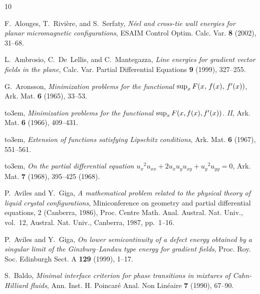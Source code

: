 \documentclass[a4paper]{article}
\theoremstyle{definition}
\theoremstyle{remark}
\begin{document}
\def\cprime{$'$}
\providecommand{\bysame}{\leavevmode\hbox to3em{\hrulefill}\thinspace}
\providecommand{\MR}{\relax\ifhmode\unskip\space\fi MR }
\providecommand{\MRhref}[2]{%
  \href{http://www.ams.org/mathscinet-getitem?mr=#1}{#2}
}
\providecommand{\href}[2]{#2}
\begin{thebibliography}{10}

F.~Alouges, T.~Rivi{\`e}re, and S.~Serfaty, \emph{N\'eel and cross-tie wall
  energies for planar micromagnetic configurations}, ESAIM Control Optim. Calc.
  Var. \textbf{8} (2002), 31--68.

L.~Ambrosio, C.~De~Lellis, and C.~Mantegazza, \emph{Line energies for gradient
  vector fields in the plane}, Calc. Var. Partial Differential Equations
  \textbf{9} (1999), 327--255.

G.~Aronsson, \emph{Minimization problems for the functional {${\rm
  sup}_{x}\,F(x,\,f(x),\,f^{\prime} (x))$}}, Ark. Mat. \textbf{6} (1965),
  33--53.

\bysame, \emph{Minimization problems for the functional {${\rm sup}_{x}\, F(x,
  f(x),f\sp\prime (x))$}. {II}}, Ark. Mat. \textbf{6} (1966), 409--431.

\bysame, \emph{Extension of functions satisfying {L}ipschitz conditions}, Ark.
  Mat. \textbf{6} (1967), 551--561.

\bysame, \emph{On the partial differential equation
  {$u_{x}{}^{2}\!u_{xx}+2u_{x}u_{y}u_{xy}+u_{y}{}^{2}\!u_{yy}=0$}}, Ark. Mat.
  \textbf{7} (1968), 395--425 (1968).

P.~Aviles and Y.~Giga, \emph{A mathematical problem related to the physical
  theory of liquid crystal configurations}, Miniconference on geometry and
  partial differential equations, 2 (Canberra, 1986), Proc. Centre Math. Anal.
  Austral. Nat. Univ., vol.~12, Austral. Nat. Univ., Canberra, 1987, pp.~1--16.

P.~Aviles and Y.~Giga, \emph{On lower semicontinuity of a defect energy obtained by a singular limit of the Ginzburg–Landau type energy for gradient fields}, Proc. Roy. Soc. Edinburgh Sect. A \textbf{129} (1999), 1--17.

S.~Baldo, \emph{Minimal interface criterion for phase transitions in mixtures
  of {C}ahn-{H}illiard fluids}, Ann. Inst. H. Poincar\'e Anal. Non Lin\'eaire
  \textbf{7} (1990), 67--90.


\end{thebibliography}
\end{document}
